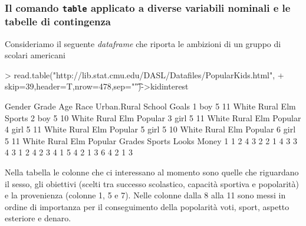 \documentclass[onecolumn,11pt]{book}
\begin{document}
\subsubsection{Il comando \texttt{table} applicato a diverse variabili nominali e le tabelle di contingenza}
Consideriamo il seguente \emph{dataframe} che riporta le ambizioni di un gruppo di scolari americani   
\begin{Schunk}
\begin{Sinput}
> read.table("http://lib.stat.cmu.edu/DASL/Datafiles/PopularKids.html",
+ skip=39,header=T,nrow=478,sep="\t")->kidinterest
\end{Sinput}
\end{Schunk}
\begin{Schunk}
\begin{Soutput}
  Gender Grade Age  Race Urban.Rural School   Goals
1    boy     5  11 White       Rural    Elm  Sports
2    boy     5  10 White       Rural    Elm Popular
3   girl     5  11 White       Rural    Elm Popular
4   girl     5  11 White       Rural    Elm Popular
5   girl     5  10 White       Rural    Elm Popular
6   girl     5  11 White       Rural    Elm Popular
  Grades Sports Looks Money
1      1      2     4     3
2      2      1     4     3
3      4      3     1     2
4      2      3     4     1
5      4      2     1     3
6      4      2     1     3
\end{Soutput}
\end{Schunk}
Nella tabella le colonne che ci interessano al momento sono quelle che riguardano il sesso, gli obiettivi (scelti tra successo scolastico, capacit\`a sportiva e popolarit\`a) e la provenienza (colonne 1, 5  e 7). Nelle colonne dalla 8 alla 11 sono messi in ordine di importanza per il conseguimento della popolarit\`a  voti, sport, aspetto esteriore e denaro.
\end{document}
